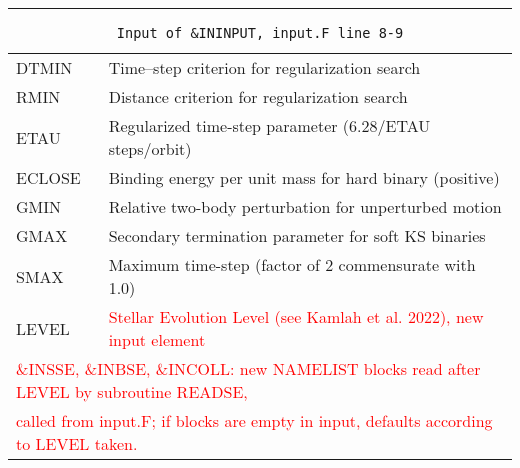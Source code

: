 \hrule
\noindent
\begin{longtable}{@{}p{1.5cm}p{13.0cm}}
\caption{\texttt{Input of \&ININPUT, input.F line 8-9}}
\label{table:ininput89}\\\hline
%
DTMIN   & Time--step criterion for regularization search \\
RMIN    & Distance criterion for regularization search \\
ETAU    & Regularized time-step parameter (6.28/ETAU steps/orbit) \\
ECLOSE  & Binding energy per unit mass for hard binary (positive) \\
GMIN    & Relative two-body perturbation for unperturbed motion \\
GMAX    & Secondary termination parameter for soft KS binaries \\
SMAX    & Maximum time-step (factor of 2 commensurate with 1.0) \\
LEVEL   & \textcolor{red}{Stellar Evolution Level (see Kamlah et al. 2022), new input element} \\
\multicolumn{2}{l}{\textcolor{red}{\&INSSE, \&INBSE, \&INCOLL: new NAMELIST blocks read after LEVEL by subroutine READSE,}} \\
\multicolumn{2}{l}{\textcolor{red}{called from input.F; if blocks are empty in input, defaults according to LEVEL taken.}}
\end{longtable}


